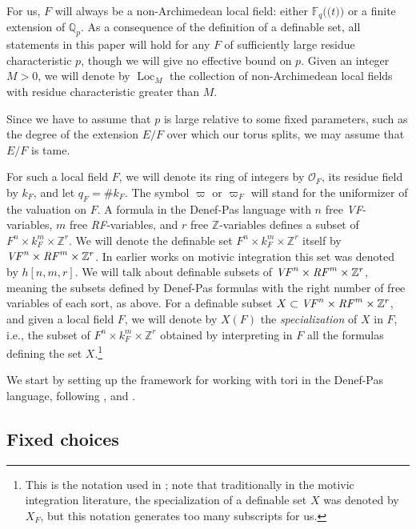 \documentclass{amsart}
\newcommand{\Q}{{\mathbb Q}}
\newcommand{\F}{{\mathbb F}}
\newcommand{\Z}{{\mathbb Z}}
\newcommand{\ri}{\mathcal{O}}
\newcommand{\loc}{\operatorname{Loc}}
\def\llp{\mathopen{(\!(}}
\def\rrp{\mathopen{)\!)}}
\theoremstyle{plain}
\theoremstyle{definition}
\begin{document}
For us, $F$ will always be a non-Archimedean local field: either $\F_q\llp t\rrp$ or a finite extension of $\Q_p$.
As a consequence of the definition of a definable set, all statements in this paper will hold for any $F$ of sufficiently large residue characteristic $p$, 
though we will give no effective bound on $p$. 
Given an integer $M>0$, we will denote by $\loc_M$ the collection of non-Archimedean local fields
with residue characteristic greater than $M$. 

Since we have to assume that $p$ is large relative to some fixed parameters, such as the degree of the extension $E/F$ over which our torus splits, we may assume that $E/F$ is tame.  

For such a local field $F$, we will denote its ring of integers by $\ri_F$, its residue field by $k_F$,
and let $q_F=\# k_F$. The symbol $\varpi$ or $\varpi_F$ will stand for the uniformizer of the valuation on $F$. 
A formula in the Denef-Pas language  with $n$ free \emph{VF}-variables, $m$ free \emph{RF}-variables, and $r$ free 
$\Z$-variables 
defines a subset of $F^n\times k_F^m \times \Z^r$. 
We will denote the definable set $F^n\times k_F^m \times \Z^r$ itself by
$\mbox{\emph{VF}}^n\times \mbox{\emph{RF}}^m\times \Z^r$.
In earlier works on motivic integration this set was denoted by $h[n,m,r]$. 
We will talk about definable subsets of $\mbox{\emph{VF}}^n\times \mbox{\emph{RF}}^m\times \Z^r$,
meaning the subsets defined by Denef-Pas formulas with the right number of free variables of each sort, as above. 
For a definable subset $X\subset \mbox{\emph{VF}}^n\times \mbox{\emph{RF}}^m\times \Z^r$, and given a local field $F$,  
we will denote by $X(F)$ the \emph{specialization} of $X$ in $F$, i.e., the subset of
$F^n\times k_F^m\times \Z^r$ obtained by interpreting in $F$ all the formulas defining the set $X$.\footnote{This
is the notation used in \cite{hales:transfert}; note that traditionally in the motivic integration literature,
the {specialization} of a definable set $X$ was denoted by $X_F$, but this notation generates too many subscripts for us.} 

We start by setting up the framework for working with tori in the Denef-Pas language, following \cite{cluckers-hales-loeser}, \cite{CGH-2} and \cite{hales:transfert}.



\subsection{Fixed choices}\label{sub:fixedchoices}
\end{document}
